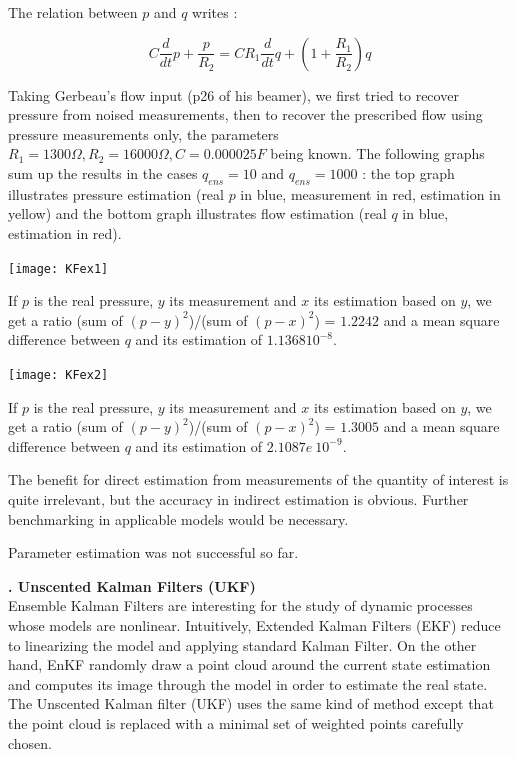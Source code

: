 \documentclass[a4paper]{article}
\newcounter{c}
\newcounter{d}
\newcounter{r}
\newcounter{e}
\newcommand{\chapitre}[1]{\stepcounter{c}\setcounter{e}{0}\setcounter{d}{0}\setcounter{r}{0}\noindent\textbf{\Large\arabic{c}. #1}\\}
\begin{document}
The relation between $p$ and $q$ writes :

$$C\frac d{dt}p+\frac p{R_2}=CR_1\frac d{dt}q+\left(1+\frac{R_1}{R_2}\right)q$$

Taking Gerbeau's flow input (p26 of his beamer), we first tried to recover pressure from noised measurements, then to recover the prescribed flow using pressure measurements only, the parameters $R_1=1300\Omega,R_2=16000\Omega,C=0.000025F$ being known. The following graphs sum up the results in the cases $q_{ens}=10$ and $q_{ens}=1000$ : the top graph illustrates pressure estimation (real $p$ in blue, measurement in red, estimation in yellow) and the bottom graph illustrates flow estimation (real $q$ in blue, estimation in red).

\begin{center}
\texttt{[image: KFex1]}
\end{center}

If $p$ is the real pressure, $y$ its measurement and $x$ its estimation based on $y$, we get a ratio (sum of $(p-y)^2$)/(sum of $(p-x)^2$) = $1.2242$ and a mean square difference between $q$ and its estimation of $1.136810^{-8}$.

\begin{center}
\texttt{[image: KFex2]}
\end{center}

If $p$ is the real pressure, $y$ its measurement and $x$ its estimation based on $y$, we get a ratio (sum of $(p-y)^2$)/(sum of $(p-x)^2$) = $1.3005$ and a mean square difference between $q$ and its estimation of $2.1087e~10^
{-9}$.

\bigskip

The benefit for direct estimation from measurements of the quantity of interest is quite irrelevant, but the accuracy in indirect estimation is obvious. Further benchmarking in applicable models would be necessary.
\bigskip

Parameter estimation was not successful so far.

\bigskip





\newpage
\chapitre{Unscented Kalman Filters (UKF)}

Ensemble Kalman Filters are interesting for the study of dynamic processes whose models are nonlinear. Intuitively, Extended Kalman Filters (EKF) reduce to linearizing the model and applying standard Kalman Filter. On the other hand, EnKF randomly draw a point cloud around the current state estimation and computes its image through the model in order to estimate the real state. The Unscented Kalman filter (UKF) uses the same kind of method except that the point cloud is replaced with a minimal set of weighted points carefully chosen.
\end{document}
